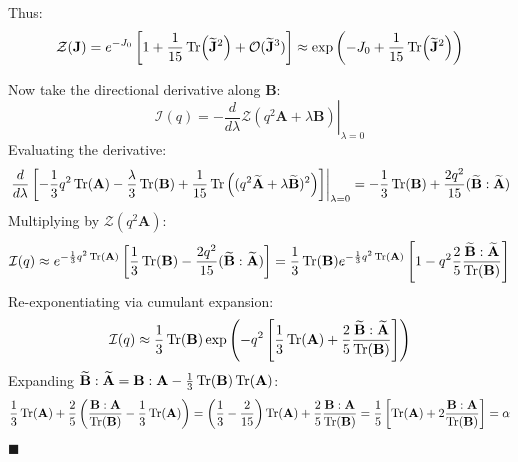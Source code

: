 \documentclass[11pt,a4paper]{article}
\theoremstyle{definition}
\begin{document}
Thus:
\begin{equation}
\mathcal{Z}(\mathbf{J}) = e^{-J_0} \left[ 1 + \frac{1}{15} \Tr(\widetilde{\mathbf{J}}^2) + \mathcal{O}(\widetilde{\mathbf{J}}^3) \right] \approx \exp\left( -J_0 + \frac{1}{15} \Tr(\widetilde{\mathbf{J}}^2) \right)
\end{equation}

Now take the directional derivative along $\mathbf{B}$:
\begin{equation}
\mathcal{I}(q) = -\left. \frac{d}{d\lambda} \mathcal{Z}(q^2 \mathbf{A} + \lambda \mathbf{B}) \right|_{\lambda=0}
\end{equation}
Evaluating the derivative:
\begin{equation}
\left. \frac{d}{d\lambda} \left[ -\frac{1}{3} q^2 \Tr(\mathbf{A}) - \frac{\lambda}{3}\Tr(\mathbf{B}) + \frac{1}{15} \Tr\left( (q^2 \widetilde{\mathbf{A}} + \lambda \widetilde{\mathbf{B}})^2 \right) \right] \right|_{\lambda=0} = -\frac{1}{3}\Tr(\mathbf{B}) + \frac{2 q^2}{15} (\widetilde{\mathbf{B}} : \widetilde{\mathbf{A}})
\end{equation}
Multiplying by $\mathcal{Z}(q^2 \mathbf{A})$:
\begin{equation}
\mathcal{I}(q) \approx e^{-\frac{1}{3}q^2 \Tr(\mathbf{A})} \left[ \frac{1}{3}\Tr(\mathbf{B}) - \frac{2 q^2}{15} (\widetilde{\mathbf{B}} : \widetilde{\mathbf{A}}) \right] = \frac{1}{3}\Tr(\mathbf{B}) e^{-\frac{1}{3}q^2 \Tr(\mathbf{A})} \left[ 1 - q^2 \frac{2}{5} \frac{\widetilde{\mathbf{B}}:\widetilde{\mathbf{A}}}{\Tr(\mathbf{B})} \right]
\end{equation}
Re-exponentiating via cumulant expansion:
\begin{equation}
\mathcal{I}(q) \approx \frac{1}{3}\Tr(\mathbf{B}) \exp\left( -q^2 \left[ \frac{1}{3}\Tr(\mathbf{A}) + \frac{2}{5} \frac{\widetilde{\mathbf{B}}:\widetilde{\mathbf{A}}}{\Tr(\mathbf{B})} \right] \right)
\end{equation}
Expanding $\widetilde{\mathbf{B}}:\widetilde{\mathbf{A}} = \mathbf{B}:\mathbf{A} - \frac{1}{3}\Tr(\mathbf{B})\Tr(\mathbf{A})$:
\begin{equation}
\frac{1}{3}\Tr(\mathbf{A}) + \frac{2}{5} \left( \frac{\mathbf{B}:\mathbf{A}}{\Tr(\mathbf{B})} - \frac{1}{3}\Tr(\mathbf{A}) \right) = \left( \frac{1}{3} - \frac{2}{15} \right) \Tr(\mathbf{A}) + \frac{2}{5} \frac{\mathbf{B}:\mathbf{A}}{\Tr(\mathbf{B})} = \frac{1}{5} \left[ \Tr(\mathbf{A}) + 2 \frac{\mathbf{B}:\mathbf{A}}{\Tr(\mathbf{B})} \right] = \alpha
\end{equation}
$\blacksquare$
\end{document}
